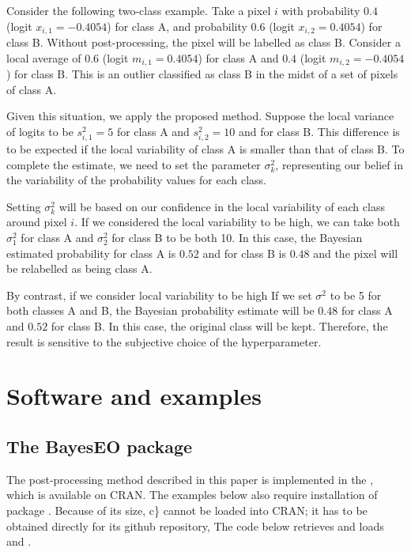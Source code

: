 \documentclass[
  shortnames]{jss}
\begin{document}
Consider the following two-class example. Take a pixel \(i\) with probability \(0.4\) (logit \(x_{i,1} = -0.4054\)) for class A, and probability \(0.6\) (logit \(x_{i,2} = 0.4054\)) for class B. Without post-processing, the pixel will be labelled as class B. Consider a local average of \(0.6\) (logit \(m_{i,1} = 0.4054\)) for class A and \(0.4\) (logit \(m_{i,2} = -0.4054\)) for class B. This is an outlier classified as class B in the midst of a set of pixels of class A.

Given this situation, we apply the proposed method. Suppose the local variance of logits to be \(s^2_{i,1} = 5\) for class A and \(s^2_{i,2} = 10\) and for class B. This difference is to be expected if the local variability of class A is smaller than that of class B. To complete the estimate, we need to set the parameter \(\sigma^2_{k}\), representing our belief in the variability of the probability values for each class.

Setting \(\sigma^2_{k}\) will be based on our confidence in the local variability of each class around pixel \({i}\). If we considered the local variability to be high, we can take both \(\sigma^2_1\) for class A and \(\sigma^2_2\) for class B to be both 10. In this case, the Bayesian estimated probability for class A is \(0.52\) and for class B is \(0.48\) and the pixel will be relabelled as being class A.

By contrast, if we consider local variability to be high If we set \(\sigma^2\) to be 5 for both classes A and B, the Bayesian probability estimate will be \(0.48\) for class A and \(0.52\) for class B. In this case, the original class will be kept. Therefore, the result is sensitive to the subjective choice of the hyperparameter.

\hypertarget{software-and-examples}{%
\section{Software and examples}\label{software-and-examples}}

\hypertarget{the-bayeseo-package}{%
\subsection{The BayesEO package}\label{the-bayeseo-package}}

The post-processing method described in this paper is implemented in the  , which is available on CRAN. The examples below also require installation of package . Because of its size, c\} cannot be loaded into CRAN; it has to be obtained directly for its github repository, The code below retrieves and loads  and .
\end{document}
